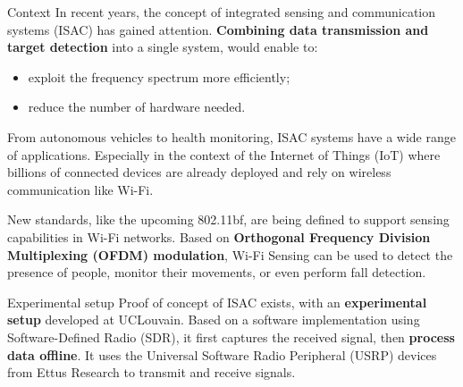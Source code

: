 \documentclass[final]{beamer}
\newlength{\onecolwid}
\begin{document}
\begin{frame}[t,fragile]
\begin{columns}[t]
\begin{column}{\onecolwid}
  \begin{block}{Context}
    In recent years, the concept of integrated sensing and communication systems (ISAC) has gained attention. 
    \textbf{Combining data transmission and target detection} into a single system, would enable to: \vspace{-0.2in}
      \begin{itemize}
        \item \hspace{0.2cm} exploit the frequency spectrum more efficiently;
        \item \hspace{0.2cm} reduce the number of hardware needed.
      \end{itemize}

    From autonomous vehicles to health monitoring, ISAC systems have a wide range of applications. 
    Especially in the context of the Internet of Things (IoT) where billions of connected devices are already deployed and rely on wireless communication like Wi-Fi.\newline

    New standards, like the upcoming 802.11bf, are being defined to support sensing capabilities in Wi-Fi networks. 
    Based on \textbf{Orthogonal Frequency Division Multiplexing (OFDM) modulation}, Wi-Fi Sensing can be used to detect the presence of people, monitor their movements, or even perform fall detection.
  \end{block}


  \begin{block}{Experimental setup}
    Proof of concept of ISAC exists, with an \textbf{experimental setup} developed at UCLouvain. 
    Based on a software implementation using Software-Defined Radio (SDR), it first captures the received signal, then \textbf{process data offline}. 
    It uses the Universal Software Radio Peripheral (USRP) devices from Ettus Research to transmit and receive signals.

    \vspace{0.5in}


\end{block}
\end{column}
\end{columns}
\end{frame}
\end{document}
